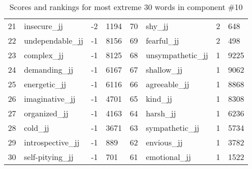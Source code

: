 \begin{table}[tbp]
\begin{tabular}{| rlr@{.}l | rlr@{.}l |}
    21 & insecure\_jj & -2 & 1194    &    70 & shy\_jj & 2 & 648 \\
    22 & undependable\_jj & -1 & 8156    &    69 & fearful\_jj & 2 & 498 \\
    23 & complex\_jj & -1 & 8125    &    68 & unsympathetic\_jj & 1 & 9225 \\
    24 & demanding\_jj & -1 & 6167    &    67 & shallow\_jj & 1 & 9062 \\
    25 & energetic\_jj & -1 & 6116    &    66 & agreeable\_jj & 1 & 8868 \\
    26 & imaginative\_jj & -1 & 4701    &    65 & kind\_jj & 1 & 8308 \\
    27 & organized\_jj & -1 & 4163    &    64 & harsh\_jj & 1 & 6236 \\
    28 & cold\_jj & -1 & 3671    &    63 & sympathetic\_jj & 1 & 5734 \\
    29 & introspective\_jj & -1 & 889    &    62 & envious\_jj & 1 & 3782 \\
    30 & self-pitying\_jj & -1 & 701    &    61 & emotional\_jj & 1 & 1522 \\
    \hline
    \end{tabular}
    \caption{Scores and rankings for most extreme 30 words in component \#10} 
\end{table}
\clearpage
